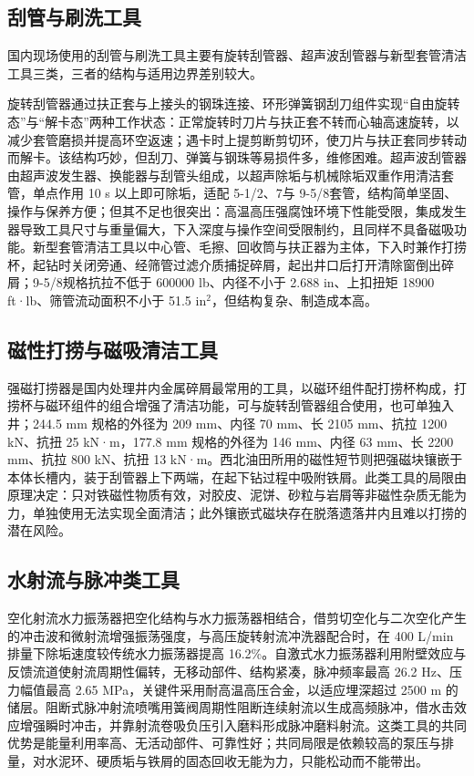 \subsection{刮管与刷洗工具}

国内现场使用的刮管与刷洗工具主要有旋转刮管器、超声波刮管器与新型套管清洁工具三类，三者的结构与适用边界差别较大。

旋转刮管器通过扶正套与上接头的钢珠连接、环形弹簧钢刮刀组件实现“自由旋转态”与“解卡态”两种工作状态：正常旋转时刀片与扶正套不转而心轴高速旋转，以减少套管磨损并提高环空返速；遇卡时上提剪断剪切环，使刀片与扶正套同步转动而解卡。该结构巧妙，但刮刀、弹簧与钢珠等易损件多，维修困难。超声波刮管器由超声波发生器、换能器与刮管头组成，以超声除垢与机械除垢双重作用清洁套管，单点作用 10 s 以上即可除垢，适配 5-1/2\inch、7\inch 与 9-5/8\inch 套管，结构简单坚固、操作与保养方便；但其不足也很突出：高温高压强腐蚀环境下性能受限，集成发生器导致工具尺寸与重量偏大，下入深度与操作空间受限制约，且同样不具备磁吸功能。新型套管清洁工具以中心管、毛擦、回收筒与扶正器为主体，下入时兼作打捞杯，起钻时关闭旁通、经筛管过滤介质捕捉碎屑，起出井口后打开清除窗倒出碎屑；9-5/8\inch 规格抗拉不低于 600000 lb、内径不小于 2.688 in、上扣扭矩 18900 ft·lb、筛管流动面积不小于 51.5 in$^2$，但结构复杂、制造成本高。

\subsection{磁性打捞与磁吸清洁工具}

强磁打捞器是国内处理井内金属碎屑最常用的工具，以磁环组件配打捞杯构成，打捞杯与磁环组件的组合增强了清洁功能，可与旋转刮管器组合使用，也可单独入井；244.5 mm 规格的外径为 209 mm、内径 70 mm、长 2105 mm、抗拉 1200 kN、抗扭 25 kN·m，177.8 mm 规格的外径为 146 mm、内径 63 mm、长 2200 mm、抗拉 800 kN、抗扭 13 kN·m。西北油田所用的磁性短节则把强磁块镶嵌于本体长槽内，装于刮管器上下两端，在起下钻过程中吸附铁屑。此类工具的局限由原理决定：只对铁磁性物质有效，对胶皮、泥饼、砂粒与岩屑等非磁性杂质无能为力，单独使用无法实现全面清洁；此外镶嵌式磁块存在脱落遗落井内且难以打捞的潜在风险。

\subsection{水射流与脉冲类工具}

空化射流水力振荡器把空化结构与水力振荡器相结合，借剪切空化与二次空化产生的冲击波和微射流增强振荡强度，与高压旋转射流冲洗器配合时，在 400 L/min 排量下除垢速度较传统水力振荡器提高 16.2\%。自激式水力振荡器利用附壁效应与反馈流道使射流周期性偏转，无移动部件、结构紧凑，脉冲频率最高 26.2 Hz、压力幅值最高 2.65 MPa，关键件采用耐高温高压合金，以适应埋深超过 2500 m 的储层。阻断式脉冲射流喷嘴用簧阀周期性阻断连续射流以生成高频脉冲，借水击效应增强瞬时冲击，并靠射流卷吸负压引入磨料形成脉冲磨料射流。这类工具的共同优势是能量利用率高、无活动部件、可靠性好；共同局限是依赖较高的泵压与排量，对水泥环、硬质垢与铁屑的固态回收无能为力，只能松动而不能带出。

